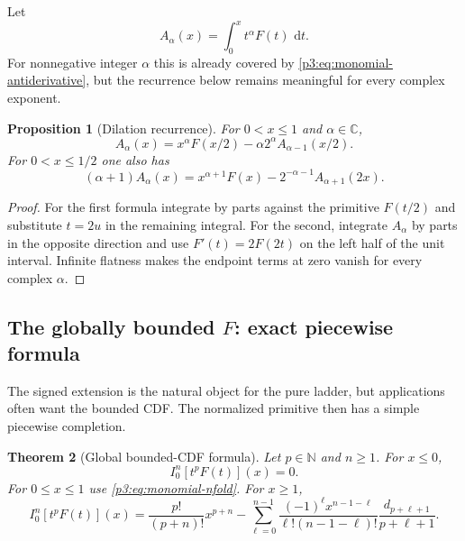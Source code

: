 \documentclass[11pt,oneside]{article}
\newtheorem{theorem}{Theorem}[section]
\newtheorem{proposition}[theorem]{Proposition}
\theoremstyle{definition}
\theoremstyle{remark}
\newcommand{\C}{\mathbb C}
\newcommand{\N}{\mathbb N}
\newcommand{\dd}{\,\mathrm d}
\newcommand{\1}{\mathbf 1}
\begin{document}
Let
\begin{equation}
 A_\alpha(x)=\int_0^x t^\alpha F(t)\,\dd t.                   \label{p3:eq:Aalpha}
\end{equation}
For nonnegative integer $\alpha$ this is already covered by
\eqref{p3:eq:monomial-antiderivative}, but the recurrence below remains meaningful for every
complex exponent.

\begin{proposition}[Dilation recurrence]
\label{p3:prop:A-recurrence}
For $0<x\le1$ and $\alpha\in\C$,
\begin{equation}
 A_\alpha(x)=x^\alpha F(x/2)-\alpha2^\alpha A_{\alpha-1}(x/2).
 \label{p3:eq:A-recurrence}
\end{equation}
For $0<x\le1/2$ one also has
\begin{equation}
 (\alpha+1)A_\alpha(x)
 =x^{\alpha+1}F(x)-2^{-\alpha-1}A_{\alpha+1}(2x).
 \label{p3:eq:A-functional-recurrence}
\end{equation}
\end{proposition}

\begin{proof}
For the first formula integrate by parts against the primitive $F(t/2)$ and substitute
$t=2u$ in the remaining integral.  For the second, integrate
$A_\alpha$ by parts in the opposite direction and use $F'(t)=2F(2t)$ on the left half of the
unit interval.  Infinite flatness makes the endpoint terms at zero vanish for every complex
$\alpha$.
\end{proof}

\subsection{The globally bounded \texorpdfstring{$F$}{F}: exact piecewise formula}

The signed extension is the natural object for the pure ladder, but applications often want
the bounded CDF.  The normalized primitive then has a simple piecewise completion.

\begin{theorem}[Global bounded-CDF formula]
\label{p3:thm:global-bounded}
Let $p\in\N$ and $n\ge1$.  For $x\le0$,
\begin{equation}
 I_0^n[t^pF(t)](x)=0.                                        \label{p3:eq:global-left}
\end{equation}
For $0\le x\le1$ use \eqref{p3:eq:monomial-nfold}.  For $x\ge1$,
\begin{equation}
 \boxed{
 I_0^n[t^pF(t)](x)
 =\frac{p!}{(p+n)!}x^{p+n}
 -\sum_{\ell=0}^{n-1}
 \frac{(-1)^\ell x^{n-1-\ell}}{\ell!(n-1-\ell)!}
 \frac{d_{p+\ell+1}}{p+\ell+1}.}
 \label{p3:eq:global-right}
\end{equation}
\end{theorem}
\end{document}
